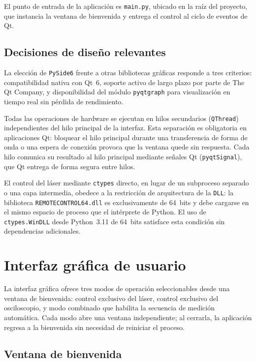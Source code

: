El punto de entrada de la aplicación es \texttt{main.py}, ubicado en
la raíz del proyecto, que instancia la ventana de bienvenida y entrega
el control al ciclo de eventos de Qt.

\subsection*{Decisiones de diseño relevantes}

La elección de \texttt{PySide6} frente a otras bibliotecas gráficas
responde a tres criterios: compatibilidad nativa con Qt~6, soporte
activo de largo plazo por parte de The Qt Company, y disponibilidad
del módulo \texttt{pyqtgraph} para visualización en tiempo real sin
pérdida de rendimiento.

Todas las operaciones de hardware se ejecutan en hilos secundarios
(\texttt{QThread}) independientes del hilo principal de la interfaz.
Esta separación es obligatoria en aplicaciones Qt: bloquear el hilo
principal durante una transferencia de forma de onda o una espera de
conexión provoca que la ventana quede sin respuesta. Cada hilo
comunica su resultado al hilo principal mediante señales Qt
(\texttt{pyqtSignal}), que Qt entrega de forma segura entre hilos.

El control del láser mediante \texttt{ctypes} directo, en lugar de
un subproceso separado o una capa intermedia, obedece a la
restricción de arquitectura de la \texttt{DLL}: la biblioteca
\texttt{REMOTECONTROL64.dll} es exclusivamente de 64~bits y debe
cargarse en el mismo espacio de proceso que el intérprete de Python.
El uso de \texttt{ctypes.WinDLL} desde Python~3.11 de 64~bits
satisface esta condición sin dependencias adicionales.

\section{Interfaz gráfica de usuario}
\label{sec:gui}

La interfaz gráfica ofrece tres modos de operación seleccionables
desde una ventana de bienvenida: control exclusivo del láser,
control exclusivo del osciloscopio, y modo combinado que habilita
la secuencia de medición automática. Cada modo abre una ventana
independiente; al cerrarla, la aplicación regresa a la bienvenida
sin necesidad de reiniciar el proceso.

\subsection*{Ventana de bienvenida}

